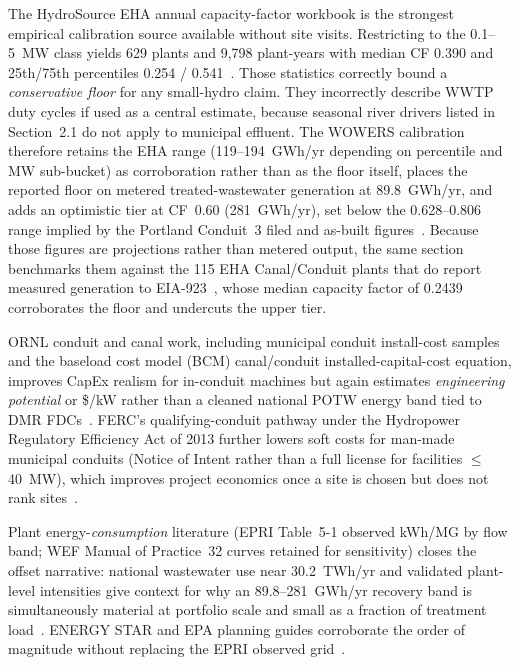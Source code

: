 \documentclass[12pt,letterpaper]{report}
\begin{document}
The HydroSource EHA annual capacity-factor workbook is the strongest empirical
calibration source available without site visits. Restricting to the 0.1--5~MW class yields
629 plants and 9,798 plant-years with median CF 0.390 and 25th/75th percentiles 0.254 /
0.541~\cite{hydrosource_eha}. Those statistics correctly bound a \emph{conservative
floor} for any small-hydro claim. They incorrectly describe WWTP duty cycles if used as a
central estimate, because seasonal river drivers listed in Section~2.1 do not apply to
municipal effluent. The WOWERS calibration therefore retains the EHA range (119--194~GWh/yr
depending on percentile and MW sub-bucket) as corroboration rather than as the floor itself,
places the reported floor on metered treated-wastewater generation at 89.8~GWh/yr, and adds
an optimistic tier at CF~0.60 (281~GWh/yr), set below the 0.628--0.806 range implied by the Portland Conduit~3
filed and as-built figures~\cite{ferc_p14498, lucidpipe}. Because those figures are
projections rather than metered output, the same section benchmarks them against the 115
EHA Canal/Conduit plants that do report measured generation to
EIA-923~\cite{hydrosource_eha, eia923}, whose median capacity factor of 0.2439
corroborates the floor and undercuts the upper tier.

ORNL conduit and canal work, including municipal conduit install-cost samples and the
baseload cost model (BCM) canal/conduit installed-capital-cost equation, improves CapEx
realism for in-conduit machines but again estimates \emph{engineering potential} or
\$/kW rather than a cleaned national POTW energy band tied to DMR
FDCs~\cite{ornl2014,osti3002705}. FERC's qualifying-conduit pathway under the Hydropower
Regulatory Efficiency Act of 2013 further lowers soft costs for man-made municipal conduits
(Notice of Intent rather than a full license for facilities $\leq$40~MW), which improves
project economics once a site is chosen but does not rank sites~\cite{ferc_conduit}.

Plant energy-\emph{consumption} literature (EPRI Table~5-1 observed kWh/MG by flow band;
WEF Manual of Practice~32 curves retained for sensitivity) closes the offset narrative:
national wastewater use near 30.2~TWh/yr and validated plant-level intensities give context
for why an 89.8--281~GWh/yr recovery band is simultaneously material at portfolio scale and
small as a fraction of treatment load~\cite{epri2013,wef_mop32}. ENERGY STAR and EPA
planning guides corroborate the order of magnitude without replacing the EPRI observed
grid~\cite{epa2013}.
\end{document}

